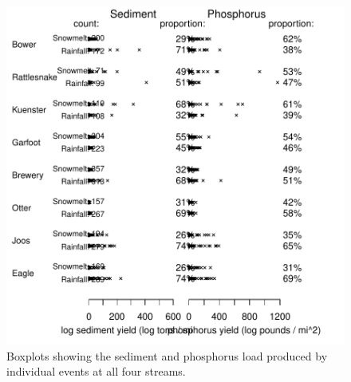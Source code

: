 \documentclass[10pt]{article}
\begin{document}
\begin{figure}[h]
    \begin{center}
\includegraphics{loadings-show_boxplots}
    \caption{Boxplots showing the sediment and phosphorus load produced by individual events at all four streams.\label{boxplots}}
    \end{center}
\end{figure}
\end{document}
